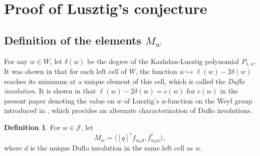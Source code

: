 \documentclass{amsart}
\theoremstyle{definition}
\newtheorem{defn}[thm]{Definition}
\begin{document}
\section{Proof of Lusztig's conjecture}

\subsection{Definition of the elements $M_w$}\label{sec:defmw}

For any $w \in W$, let $\delta(w)$ be the degree of the Kazhdan-Lusztig polynomial $P_{1,w}$. It was shown in \cite{Jos} that for each left cell of $W$, the function $w \mapsto \ell(w) - 2\delta(w)$ reaches its minimum at a unique element of this cell, which is called the \emph{Duflo involution}. It is shown in \cite{LCellsII} that $\ell(w) - 2\delta(w) = c(w)$ for $c(w)$ in the present paper denoting the value on $w$ of Lusztig's $a$-function on the Weyl group introduced in \cite{LCellsI}, which provides an alternate characterization of Duflo involutions.

\begin{defn}\label{def:mw}
    For $w \in \mathcal{J}$, let 
    \begin{equation*}
        M_w = \langle [q]^*f_{w_0d}, f_{w_0w}^*\rangle,
    \end{equation*}
    where $d$ is the unique Duflo involution in the same left cell as $w$.
\end{defn}
\end{document}
